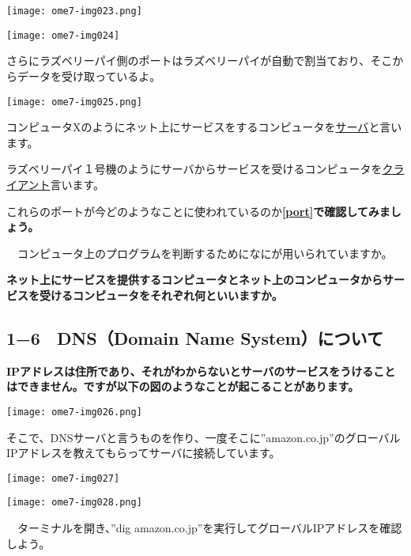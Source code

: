 \clearpage

\centering
\texttt{[image: ome7-img023.png]}

\centering
\texttt{[image: ome7-img024]}
\flushleft

さらにラズベリーパイ側のポートはラズベリーパイが自動で割当ており、そこからデータを受け取っているよ。

\centering
\texttt{[image: ome7-img025.png]}
\flushleft

コンピュータXのようにネット上にサービスをするコンピュータを\underline{サーバ}と言います。

ラズベリーパイ１号機のようにサーバからサービスを受けるコンピュータを\underline{クライアント}言います。

これらのポートが今どのようなことに使われているのか\textbf{\ref{port}で確認してみましょう。}

{\theQuestion　コンピュータ上のプログラムを判断するためになにが用いられていますか。\label{Q:port}}

{\bfseries {}}

{\bfseries ネット上にサービスを提供するコンピュータとネット上のコンピュータからサービスを受けるコンピュータをそれぞれ何といいますか。}

{\bfseries {}}

\clearpage
\subsection*{1−6　DNS（Domain Name System）について}
\label{P:DNS}

{\bfseries IPアドレスは住所であり、それがわからないとサーバのサービスをうけることはできません。ですが以下の図のようなことが起こることがあります。}

\centering
\texttt{[image: ome7-img026.png]}
\flushleft

そこで、DNSサーバと言うものを作り、一度そこに”amazon.co.jp”のグローバルIPアドレスを教えてもらってサーバに接続しています。

\centering
\texttt{[image: ome7-img027]}
\flushleft

\clearpage

\centering
\texttt{[image: ome7-img028.png]}
\flushleft

{\theQuestion　ターミナルを開き、”dig amazon.co.jp”を実行してグローバルIPアドレスを確認しよう。\label{Q:dig}}

